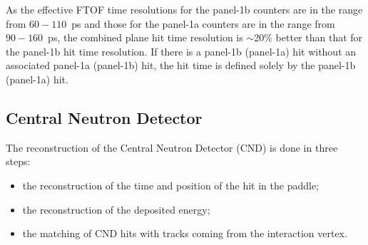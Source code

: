 \documentclass[3p,times,twocolumn]{elsarticle}
\begin{document}
As the effective FTOF time resolutions for the panel-1b counters are in the range from $60-110$~ps and those
for the panel-1a counters are in the range from $90-160$~ps, the combined plane hit time resolution is $\sim$20\%
better than that for the panel-1b hit time resolution. If there is a panel-1b (panel-1a) hit without an associated
panel-1a (panel-1b) hit, the hit time is defined solely by the panel-1b (panel-1a) hit.

\subsection{Central Neutron Detector}

The reconstruction of the Central Neutron Detector (CND) is done in three steps:

\begin{itemize}
\item{the reconstruction of the time and position of the hit in the paddle;}
\item{the reconstruction of the deposited energy;}
\item{the matching of CND hits with tracks coming from the interaction vertex.}
\end{itemize}

%
\end{document}
